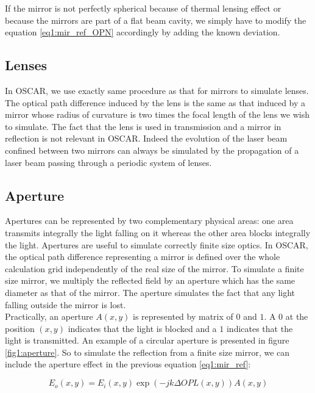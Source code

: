 If the mirror is not perfectly spherical because of thermal lensing effect or because the mirrors are part of a flat beam cavity, we simply have to modify the equation \ref{eq1:mir_ref_OPN} accordingly by adding the known deviation.


\subsection{Lenses}

In OSCAR, we use exactly same procedure as that for mirrors to simulate lenses. The optical path difference induced by the lens is the same as that induced by a mirror whose radius of curvature is two times the focal length of the lens we wish to simulate. The fact that the lens is used in transmission and a mirror in reflection is not relevant in OSCAR. Indeed the evolution of the laser beam confined between two mirrors can always be simulated by the propagation of a laser beam passing through a periodic system of lenses\cite{Kogelnik}.


\subsection{Aperture}

\label{sec1:aperture}

Apertures can be represented by two complementary physical areas: one area transmits integrally the light falling on it whereas the other area blocks integrally the light. Apertures are useful to simulate correctly finite size optics. In OSCAR, the optical path difference representing a mirror is defined over the whole calculation grid independently of the real size of the mirror. To simulate a finite size mirror, we multiply the reflected field by an aperture which has the same diameter as that of the mirror. The aperture simulates the fact that any light falling outside the mirror is lost.\\

Practically, an aperture $A(x,y)$ is represented by matrix of $0$ and $1$. A $0$ at the position $(x,y)$ indicates that the light is blocked and a $1$ indicates that the light is transmitted. An example of a circular aperture is presented in figure \ref{fig1:aperture}. So to simulate the reflection from a finite size mirror, we can include the aperture effect in the previous equation \ref{eq1:mir_ref}:

\begin{equation}
E_o(x,y) = E_i(x,y) \exp{(-j k \Delta OPL(x,y))} A(x,y)
\end{equation}


